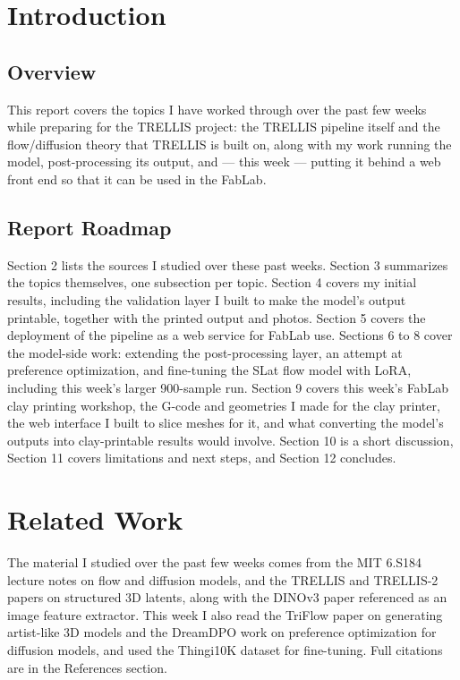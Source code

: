 \documentclass[11pt,a4paper]{article}
\begin{document}
\section{Introduction}
\subsection{Overview}
This report covers the topics I have worked through over the past few weeks while preparing for the TRELLIS project: the TRELLIS pipeline itself and the flow/diffusion theory that TRELLIS is built on, along with my work running the model, post-processing its output, and --- this week --- putting it behind a web front end so that it can be used in the FabLab.

\subsection{Report Roadmap}
Section 2 lists the sources I studied over these past weeks. Section 3 summarizes the topics themselves, one subsection per topic. Section 4 covers my initial results, including the validation layer I built to make the model's output printable, together with the printed output and photos. Section 5 covers the deployment of the pipeline as a web service for FabLab use. Sections 6 to 8 cover the model-side work: extending the post-processing layer, an attempt at preference optimization, and fine-tuning the SLat flow model with LoRA, including this week's larger 900-sample run. Section 9 covers this week's FabLab clay printing workshop, the G-code and geometries I made for the clay printer, the web interface I built to slice meshes for it, and what converting the model's outputs into clay-printable results would involve. Section 10 is a short discussion, Section 11 covers limitations and next steps, and Section 12 concludes.


\section{Related Work}
The material I studied over the past few weeks comes from the MIT 6.S184 lecture notes on flow and diffusion models, and the TRELLIS and TRELLIS-2 papers on structured 3D latents, along with the DINOv3 paper referenced as an image feature extractor. This week I also read the TriFlow paper on generating artist-like 3D models and the DreamDPO work on preference optimization for diffusion models, and used the Thingi10K dataset for fine-tuning. Full citations are in the References section.
\end{document}
